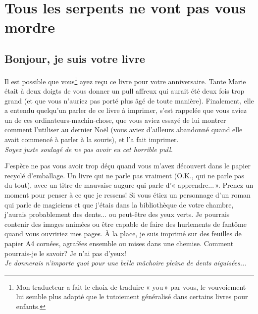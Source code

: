 


\mainmatter
\clearemptydoublepage
\chapter{Tous les serpents ne vont pas vous mor\-dre}
\section{Bonjour, je suis votre livre}
Il est possible que vous\footnote{Mon traducteur a fait le choix de traduire « you » par vous, le vouvoiement lui semble plus adapté que le tutoiement généralisé dans certains livres pour enfants.} ayez reçu ce livre pour votre anniversaire. Tante Marie était à deux doigts de vous donner un pull affreux qui aurait été deux fois trop grand (et que vous n'auriez pas porté plus âgé de toute manière). Finalement, elle a entendu quelqu'un parler de ce livre à imprimer, s'est rappelée que vous aviez un de ces ordinateurs-machin-chose, que vous aviez essayé de lui montrer comment l'utiliser au dernier Noël (vous aviez d'ailleurs abandonné quand elle avait commencé à parler à la souris), et l'a fait imprimer.
\\


\emph{Soyez juste soulagé de ne pas avoir eu cet horrible pull.\\}


J'espère ne pas vous avoir trop déçu quand vous m'avez découvert dans le papier recyclé d'emballage. Un livre qui ne parle pas vraiment (O.K., qui ne parle pas du tout), avec un titre de mauvaise augure qui parle d'« apprendre... ». Prenez un moment pour penser à ce que je ressens! Si vous étiez un personnage d'un roman qui parle de magiciens et que j'étais dans la bibliothèque de votre chambre, j'aurais probablement des dents... ou peut-être des yeux verts. Je pourrais contenir des images animées ou être capable de faire des hurlements de fantôme quand vous ouvririez mes pages. À la place, je suis imprimé sur des feuilles de papier A4 cornées, agrafées ensemble ou mises dans une chemise. Comment pourrais-je le savoir? Je n'ai pas d'yeux!\\


\emph{Je donnerais n'importe quoi pour une belle mâchoire pleine de dents aiguisées...}\\


